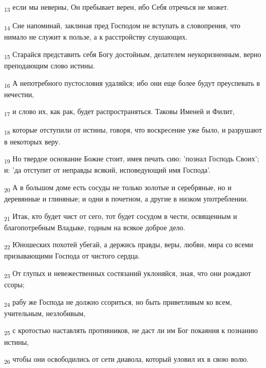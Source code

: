 \begin{tcolorbox}
\textsubscript{13} если мы неверны, Он пребывает верен, ибо Себя отречься не может.
\end{tcolorbox}
\begin{tcolorbox}
\textsubscript{14} Сие напоминай, заклиная пред Господом не вступать в словопрения, что нимало не служит к пользе, а к расстройству слушающих.
\end{tcolorbox}
\begin{tcolorbox}
\textsubscript{15} Старайся представить себя Богу достойным, делателем неукоризненным, верно преподающим слово истины.
\end{tcolorbox}
\begin{tcolorbox}
\textsubscript{16} А непотребного пустословия удаляйся; ибо они еще более будут преуспевать в нечестии,
\end{tcolorbox}
\begin{tcolorbox}
\textsubscript{17} и слово их, как рак, будет распространяться. Таковы Именей и Филит,
\end{tcolorbox}
\begin{tcolorbox}
\textsubscript{18} которые отступили от истины, говоря, что воскресение уже было, и разрушают в некоторых веру.
\end{tcolorbox}
\begin{tcolorbox}
\textsubscript{19} Но твердое основание Божие стоит, имея печать сию: 'познал Господь Своих'; и: 'да отступит от неправды всякий, исповедующий имя Господа'.
\end{tcolorbox}
\begin{tcolorbox}
\textsubscript{20} А в большом доме есть сосуды не только золотые и серебряные, но и деревянные и глиняные; и одни в почетном, а другие в низком употреблении.
\end{tcolorbox}
\begin{tcolorbox}
\textsubscript{21} Итак, кто будет чист от сего, тот будет сосудом в чести, освященным и благопотребным Владыке, годным на всякое доброе дело.
\end{tcolorbox}
\begin{tcolorbox}
\textsubscript{22} Юношеских похотей убегай, а держись правды, веры, любви, мира со всеми призывающими Господа от чистого сердца.
\end{tcolorbox}
\begin{tcolorbox}
\textsubscript{23} От глупых и невежественных состязаний уклоняйся, зная, что они рождают ссоры;
\end{tcolorbox}
\begin{tcolorbox}
\textsubscript{24} рабу же Господа не должно ссориться, но быть приветливым ко всем, учительным, незлобивым,
\end{tcolorbox}
\begin{tcolorbox}
\textsubscript{25} с кротостью наставлять противников, не даст ли им Бог покаяния к познанию истины,
\end{tcolorbox}
\begin{tcolorbox}
\textsubscript{26} чтобы они освободились от сети диавола, который уловил их в свою волю.
\end{tcolorbox}
